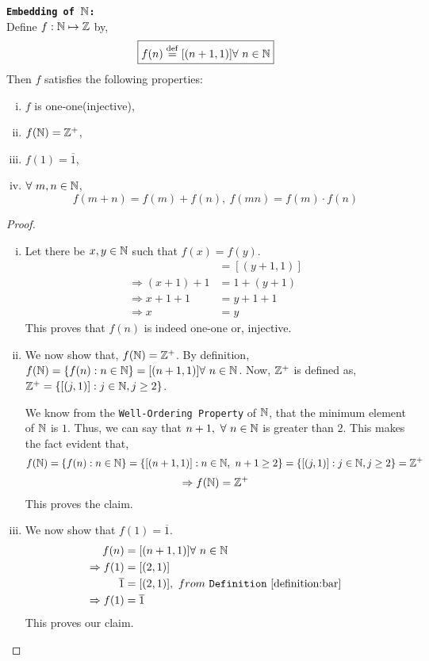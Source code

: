 \documentclass[11pt]{scrartcl}
\begin{document}
	\begin{theorem}
		\texttt{\textbf{Embedding of $\mathbb N$: }}\\
		Define $f:\mathbb N \mapsto \mathbb Z$ by,
		$$\boxed{f(n) \overset{\mathrm{def}}{=} [(n+1,1)] \forall\ n \in \mathbb N}$$
		Then $f$ satisfies the following properties:
		\begin{enumerate}[i)]
			\item $f$ is one-one(injective),
			\item $f(\mathbb N) = \mathbb Z^{+}$,
			\item $f(1) = \overline{1}$,
			\item $\forall\ m,n \in \mathbb N$, $$f(m+n)= f(m)+f(n),\ f(mn) = f(m)\cdot f(n)$$
		\end{enumerate}
	\label{theorem:embed}
	\end{theorem}
	\begin{proof}
		\begin{enumerate}[i)]
			\item Let there be $x,y \in \mathbb N$ such that $f(x)=f(y)$.
			\begin{align*}
				[(x+1,1)] &= [(y+1,1)]\\
				\Rightarrow (x+1)+1 &= 1+(y+1)\\
				\Rightarrow x+1+1 &= y+1+1\\
				\Rightarrow x &= y
			\end{align*}
			This proves that $f(n)$ is indeed one-one or, injective.
			
			\item We now show that, $f(\mathbb N) = \mathbb Z^{+}$. By definition, $f(\mathbb N) = \{f(n):n \in \mathbb N\} = [(n+1,1)] \forall\ n \in \mathbb N$. Now, $\mathbb Z^{+}$ is defined as, $\mathbb Z^{+} = \{[(j,1)]: j \in \mathbb N, j\geq 2\}$.
			
			We know from the \texttt{Well-Ordering Property} of $\mathbb N$, that the minimum element of $\mathbb N$ is $1$. Thus, we can say that $n+1,\ \forall\ n\in \mathbb N$ is greater than $2$. This makes the fact evident that,
			$$f(\mathbb N) = \{f(n):n \in \mathbb N\} = \{[(n+1,1)]: n \in \mathbb N,\ n+1 \geq 2\} = \{[(j,1)]: j \in \mathbb N, j\geq 2\} = \mathbb Z^{+} $$
			$$\Rightarrow f(\mathbb N) = \mathbb Z^{+}$$
			This proves the claim.
			
			\item We now show that $f(1) = \overline{1}$.
			\begin{align*}
				f(n) &= [(n+1,1)] \forall\ n \in \NN\\
				\Rightarrow f(1) &= [(2,1)]\\
				\overline{1} &= [(2,1)],\ from\ \texttt{Definition}\ \ref{definition:bar}\\
				\Rightarrow f(1) &= \overline{1}
			\end{align*}
		This proves our claim.
		

\end{enumerate}
\end{proof}
\end{document}

